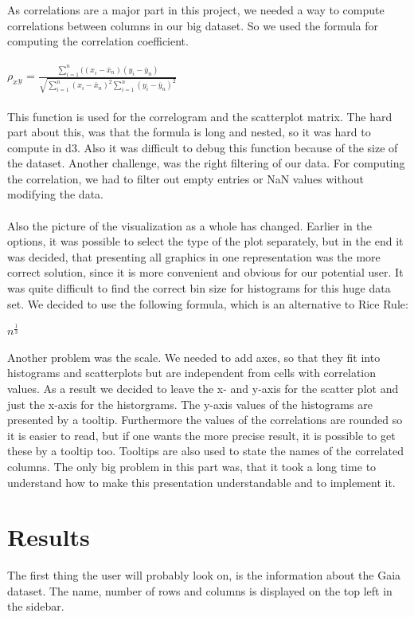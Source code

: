 \documentclass{vgtc}                          %
\begin{document}
As correlations are a major part in this project, we needed a way to compute correlations between columns in our big dataset.
So we used the formula for computing the correlation coefficient.\cite{corr}
\\
\\
$\rho_x{}_y$ = $\frac{\sum_{i=1}^n ((x_i-\overline{x}_n)(y_i - \overline{y}_n)}{\sqrt{\sum_{i=1}^n (x_i - \overline{x}_n)^2\sum_{i=1}^n(y_i - \overline{y}_n)^2}}$
\\
\\
This function is used for the correlogram and the scatterplot matrix.
The hard part about this, was that the formula is long and nested, so it was hard to compute in d3. Also it was difficult to debug this function because of the size of the dataset. Another challenge, was the right filtering of our data. For computing the correlation, we had to filter out empty entries or NaN values without modifying the data.
\\
\\
Also the picture of the visualization as a whole has changed. Earlier in the options, it was possible to select the type of the plot separately, but in the end it was decided, that presenting all graphics in one representation was the more correct solution, since it is more convenient and obvious for our potential user.
It was quite difficult to find the correct bin size for histograms for this huge data set. We decided to use the following formula, which is an alternative to Rice Rule:

$n^{\frac{1}{3}}$

Another problem was the scale. We needed to add axes, so that they fit into histograms and scatterplots but are independent from cells with correlation values. As a result we decided to leave the x- and y-axis for the scatter plot and just the x-axis for the historgrams. The y-axis values of the histograms are presented by a tooltip. Furthermore the values of the correlations are rounded so it is easier to read, but if one wants the more precise result, it is possible to get these by a tooltip too. Tooltips are also used to state the names of the correlated columns.
The only big problem in this part was, that it took a long time to understand how to make this presentation understandable and to implement it.


\section{Results}
The first thing the user will probably look on, is the information about the Gaia dataset. The name, number of rows and columns is displayed on the top left in the sidebar. \\
\end{document}
